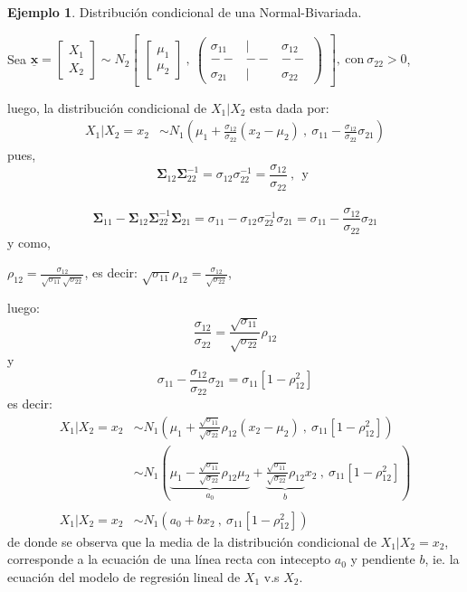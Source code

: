 \documentclass[
]{book}
\theoremstyle{definition}
\theoremstyle{definition}
\newtheorem{example}{Ejemplo}[chapter]
\theoremstyle{definition}
\theoremstyle{definition}
\theoremstyle{remark}
\begin{document}
\begin{example}
\protect\hypertarget{exm:ejemplo1-prop-6}{}\label{exm:ejemplo1-prop-6}Distribución condicional de una Normal-Bivariada.

Sea \(\underline{\mathbf{x}}=\begin{bmatrix} X_1 \\ X_2 \end{bmatrix} \sim N_{2} \begin{bmatrix} \begin{bmatrix} \mu_{1} \\ \mu_{2} \end{bmatrix} \ , \ \begin{pmatrix} \sigma_{11} & | & \sigma_{12} \\ -- & -- & -- \\ \sigma_{21} & | & \sigma_{22} \end{pmatrix} \end{bmatrix},\  \text{con} \  \sigma_{22}>0\),

luego, la distribución condicional de \(X_1 | X_2\) esta dada por:
\begin{align*}
X_1 | X_2=x_2 & \sim N_1 \left(\mu_1+\frac{\sigma_{12}}{\sigma_{22}}(x_2-\mu_2)\ , \ \sigma_{11}-\frac{\sigma_{12}}{\sigma_{22}}\sigma_{21} \right)
\end{align*}
pues,
\[
\mathbf{\Sigma}_{12}\mathbf{\Sigma}_{22}^{-1}=\sigma_{12}\sigma_{22}^{-1}=\frac{\sigma_{12}}{\sigma_{22}} \ , \ \ \text{y} \ \ 
\]\\
\[
\mathbf{\Sigma}_{11}-\mathbf{\Sigma}_{12}\mathbf{\Sigma}_{22}^{-1}\mathbf{\Sigma}_{21}=\sigma_{11}-
\sigma_{12}\sigma_{22}^{-1}\sigma_{21}=\sigma_{11}-\frac{\sigma_{12}}{\sigma_{22}}\sigma_{21}
\]
y como,

\(\rho_{12}=\frac{\sigma_{12}}{\sqrt{\sigma_{11}}\sqrt{\sigma_{22}}}\), es decir: \(\sqrt{\sigma_{11}}\rho_{12} =\frac{\sigma_{12}}{\sqrt{\sigma_{22}}}\),

luego:
\[
\frac{\sigma_{12}}{\sigma_{22}}=\frac{\sqrt{\sigma_{11}}}{\sqrt{\sigma_{22}}}\rho_{12}
\]
y
\[
\sigma_{11}-\frac{\sigma_{12}}{\sigma_{22}}\sigma_{21}=\sigma_{11}\left[ 1 - \rho_{12}^2\right]
\]
es decir:
\begin{align*}
X_1 | X_2=x_2 & \sim N_1 \left(\mu_1+\frac{\sqrt{\sigma_{11}}}{\sqrt{\sigma_{22}}}\rho_{12}(x_2-\mu_2)\ , \ \sigma_{11}\left[ 1 - \rho_{12}^2\right] \right)\\
& \sim N_1 \left(\underset{a_0}{\underbrace{ \mu_1-\frac{\sqrt{\sigma_{11}}}{\sqrt{\sigma_{22}}}\rho_{12}\mu_2}}+ \underset{b}{\underbrace{\frac{\sqrt{\sigma_{11}}}{\sqrt{\sigma_{22}}}\rho_{12}}}x_2\ , \ \sigma_{11}\left[ 1 - \rho_{12}^2\right] \right)\\
&\\
X_1 | X_2=x_2&\sim N_1 \left(a_0+b x_2\ , \ \sigma_{11}\left[ 1 - \rho_{12}^2\right] \right)
\end{align*}
de donde se observa que la media de la distribución condicional de \(X_1 | X_2=x_2\), corresponde a la ecuación de una línea recta con intecepto \(a_0\) y pendiente \(b\), ie. la ecuación del modelo de regresión lineal de \(X_1\) v.s \(X_2\).
\end{example}
\end{document}
